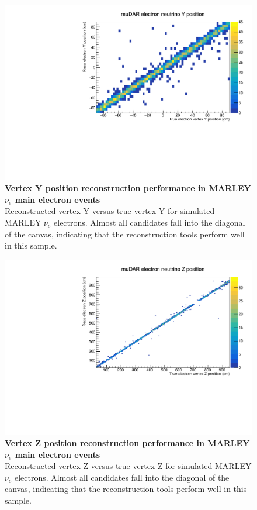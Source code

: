 \begin{figure}[h!]
    \centering
    \includegraphics[width=120mm]{Figures/y_reco_vs_true.pdf}
    \caption[Vertex Y position reconstruction performance in MARLEY $\nu_e$ main electron events]{{\textbf{Vertex Y position reconstruction performance in MARLEY $\nu_e$ main electron events}}\\ Reconstructed vertex Y versus true vertex Y for simulated MARLEY $\nu_e$ electrons. Almost all candidates fall into the diagonal of the canvas, indicating that the reconstruction tools perform well in this sample.}
    \label{reco_vs_true_vertex_y}
\end{figure}

\begin{figure}[h!]
    \centering
    \includegraphics[width=120mm]{Figures/z_reco_vs_true.pdf}
    \caption[Vertex Z position reconstruction performance in MARLEY $\nu_e$ main electron events]{{\textbf{Vertex Z position reconstruction performance in MARLEY $\nu_e$ main electron events}}\\ Reconstructed vertex Z versus true vertex Z for simulated MARLEY $\nu_e$ electrons. Almost all candidates fall into the diagonal of the canvas, indicating that the reconstruction tools perform well in this sample.}
    \label{reco_vs_true_vertex_z}
\end{figure}

